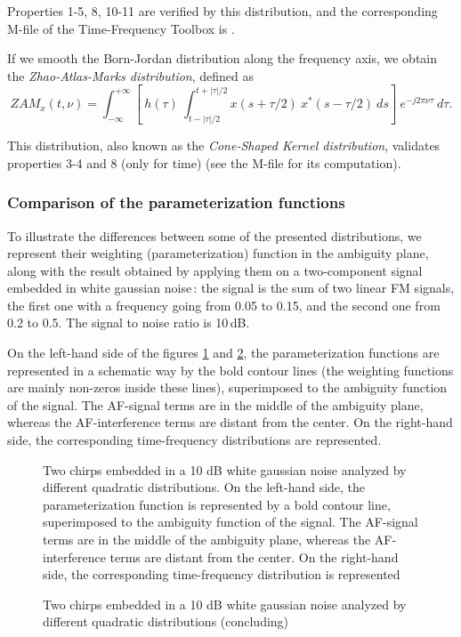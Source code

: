 \begin{itemize}
Properties 1-5, 8, 10-11 are verified by this distribution, and the
corresponding M-file of the Time-Frequency Toolbox is .

  If we smooth the Born-Jordan distribution along the frequency axis, we
obtain the {\it Zhao-Atlas-Marks distribution}, defined as
\[ZAM_x(t,\nu)=\int_{-\infty}^{+\infty} \left[\ h(\tau)\
\int_{t-|\tau|/2}^{t+|\tau|/2} x(s+\tau/2)\ x^*(s-\tau/2)\ ds\right]\
e^{-j2\pi \nu \tau}\ d\tau. \] 
  
This distribution, also known as the {\it Cone-Shaped Kernel distribution},
validates properties 3-4 and 8 (only for time) (see the M-file
\index{\ttfamily tfrzam}{\ttfamily tfrzam.m} for its computation).
\end{itemize}

\subsubsection{Comparison of the parameterization functions}

  To illustrate the differences between some of the presented
distributions, we represent their weighting (parameterization) function in
the ambiguity plane, along with the result obtained by applying them on a
two-component signal embedded in white gaussian noise\,: the signal is the
sum of two linear FM signals, the first one with a frequency going from
0.05 to 0.15, and the second one from 0.2 to 0.5. The signal to noise ratio
is 10\,dB.

  On the left-hand side of the figures \ref{En1fig16} and \ref{En1fig17},
the parameterization functions are represented in a schematic way by the
bold contour lines (the weighting functions are mainly non-zeros inside
these lines), superimposed to the ambiguity function of the signal. The
AF-signal terms are in the middle of the ambiguity plane, whereas the
AF-interference terms are distant from the center. On the right-hand side,
the corresponding time-frequency distributions are represented.
\begin{figure}[htb]
\epsfxsize=12cm
\epsfysize=10cm
\centerline{}
\caption{\label{En1fig16}Two chirps embedded in a 10 dB white gaussian
noise analyzed by different quadratic distributions. On the left-hand side,
the parameterization function is represented by a bold contour line,
superimposed to the ambiguity function of the signal. The AF-signal terms
are in the middle of the ambiguity plane, whereas the AF-interference terms
are distant from the center. On the right-hand side, the corresponding
time-frequency distribution is represented}
\end{figure}
\begin{figure}[htb]
\epsfxsize=12cm
\epsfysize=8cm
\centerline{}
\caption{\label{En1fig17}Two chirps embedded in a 10 dB white gaussian
noise analyzed by different quadratic distributions (concluding)}
\end{figure}

